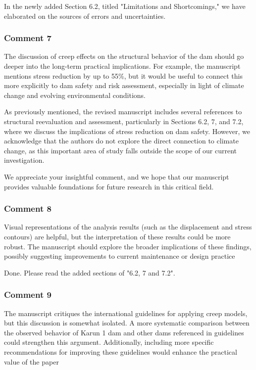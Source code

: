 \documentclass{ar2rc}
\begin{document}
{	\AR In the newly added Section 6.2, titled "Limitations and Shortcomings," we have elaborated on the sources of errors and uncertainties.
	
	
	\subsubsection{Comment 7}
	\RC	The discussion of creep effects on the structural behavior of the dam should go deeper into the long-term practical implications. For example, the manuscript mentions stress reduction by up to 55\%, but it would be useful to connect this more explicitly to dam safety and risk	assessment, especially in light of climate change and evolving environmental conditions.
	
	\AR As previously mentioned, the revised manuscript includes several references to structural reevaluation and assessment, particularly in Sections 6.2, 7, and 7.2, where we discuss the implications of stress reduction on dam safety. However, we acknowledge that the authors do not explore the direct connection to climate change, as this important area of study falls outside the scope of our current investigation.
	
	We appreciate your insightful comment, and we hope that our manuscript provides valuable foundations for future research in this critical field.	
	
	\subsubsection{Comment 8}
	\RC	Visual representations of the analysis results (such as the displacement and stress contours) are helpful, but the interpretation of these results could be more robust. The manuscript should explore the broader implications of these findings, possibly suggesting improvements	to current maintenance or design practice
	
	\AR Done. Please read the added sections of "6.2, 7 and 7.2".
	
	\subsubsection{Comment 9}
	\RC The manuscript critiques the international guidelines for applying creep models, but this discussion is somewhat isolated. A more systematic comparison between the observed behavior of Karun 1 dam and other dams referenced in guidelines could strengthen this argument. Additionally, including more specific recommendations for improving these guidelines would enhance the practical value of the paper
	
}
\end{document}
